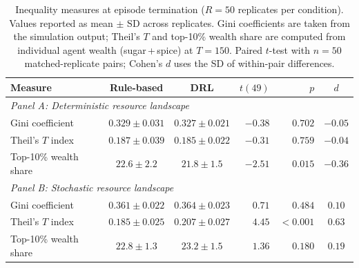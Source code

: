 \documentclass[pdflatex,sn-mathphys-num]{sn-jnl}%
\theoremstyle{thmstyleone}%
\theoremstyle{thmstyletwo}%
\theoremstyle{thmstylethree}%
\begin{document}
\begin{table}[ht]
\centering
\caption{Inequality measures at episode termination ($R = 50$ replicates per condition). Values reported as mean $\pm$ SD across replicates. Gini coefficients are taken from the simulation output; Theil's $T$ and top-10\% wealth share are computed from individual agent wealth (sugar\,+\,spice) at $T = 150$. Paired $t$-test with $n = 50$ matched-replicate pairs; Cohen's $d$ uses the SD of within-pair differences.}
\label{tab:inequality}
\begin{tabular}{lccrrc}
\toprule
\textbf{Measure} & \textbf{Rule-based} & \textbf{DRL} & $t(49)$ & $p$ & $d$ \\
\midrule
\multicolumn{6}{l}{\textit{Panel A: Deterministic resource landscape}} \\[2pt]
Gini coefficient          & $0.329 \pm 0.031$ & $0.327 \pm 0.021$ & $-0.38$ & $0.702$    & $-0.05$ \\
Theil's $T$ index         & $0.187 \pm 0.039$ & $0.185 \pm 0.022$ & $-0.31$ & $0.759$    & $-0.04$ \\
Top-10\% wealth share     & $22.6 \pm 2.2$    & $21.8 \pm 1.5$    & $-2.51$ & $0.015$    & $-0.36$ \\
\midrule
\multicolumn{6}{l}{\textit{Panel B: Stochastic resource landscape}} \\[2pt]
Gini coefficient          & $0.361 \pm 0.022$ & $0.364 \pm 0.023$ & $0.71$  & $0.484$    & $0.10$  \\
Theil's $T$ index         & $0.185 \pm 0.025$ & $0.207 \pm 0.027$ & $4.45$  & $<\!0.001$ & $0.63$  \\
Top-10\% wealth share     & $22.8 \pm 1.3$    & $23.2 \pm 1.5$    & $1.36$  & $0.180$    & $0.19$  \\
\bottomrule
\end{tabular}
\end{table}
\end{document}
